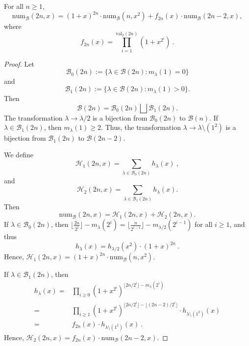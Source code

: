 \documentclass[10pt,a4paper]{amsart}
\def\B{\mathcal{B}}
\def\num{\mathrm{num}}
\def\val{\mathrm{val}}
\begin{document}
\begin{theorem}
For all $n\geq 1$, 
\begin{equation*}
\num_\mathcal B(2n,x)=(1+x)^{2n}\cdot\num_\B(n,x^2)+ f_{2n}(x)\cdot\num_{\B}(2n-2,x),
\end{equation*}
where 
\begin{equation*}
    f_{2n}(x)=\prod_{i=1}^{\val_2(2n)}(1+x^{2^i})\:.
\end{equation*}
\end{theorem}

\begin{proof}
Let 
$$\mathcal B_0(2n):=\{ \lambda\in \mathcal B(2n): m_\lambda(1)=0\} 
$$
and 
$$\mathcal B_1(2n):=\{ \lambda\in \mathcal B(2n): m_\lambda(1)>0\}.$$
 Then  $$\mathcal B(2n)=\mathcal B_0(2n)\bigsqcup \mathcal B_1(2n).$$ 
The transformation $\lambda\to\lambda/2$ is a bijection from $\mathcal B_0(2n)$ to $\mathcal B(n)$.  If $\lambda \in \mathcal B_1(2n)$, then  $m_\lambda(1)\geq 2$. Thus, the transformation $\lambda\to \lambda\setminus(1^2)$ is a bijection from $\mathcal B_1(2n)$ to $\mathcal B(2n-2)$.


We define
 \begin{equation*}\label{eq:recursion_for_numast}
     \mathcal H_1(2n,x)=\sum_{\lambda\in  \B_0(2n)}h_\lambda(x)\:,
 \end{equation*}
and
\begin{equation*}
     \mathcal H_2(2n,x)=\sum_{\lambda\in  \B_1(2n)}h_\lambda(x).
 \end{equation*}
Then 
\begin{equation*}
\num_\mathcal B(2n,x)=\mathcal H_1(2n,x)+ \mathcal H_2(2n,x).
\end{equation*}
If  $\lambda\in \mathcal B_0(2n)$, then $\lfloor \frac{2n}{2^i}\rfloor-m_\lambda(2^i)=\lfloor \frac{n}{2^{i-1}}\rfloor-m_{\lambda/2}(2^{i-1})$ for all $i\geq 1$, and thus
    \[h_\lambda(x)=h_{\lambda/2}(x^2)\cdot(1+x)^{2n}\:.\]
Hence, $\mathcal H_1(2n,x)=(1+x)^{2n}\cdot\num_\B(n,x^2)$.

If $\lambda\in\B_1(2n)$,  then
    \begin{align*}
        h_\lambda(x)=&\prod_{i\geq 0}(1+x^{2^i})^{\lfloor 2n/2^i\rfloor-m_\lambda(2^i)}\\
        =& \prod_{i\geq 1}(1+x^{2^i})^{\lfloor 2n/2^i\rfloor-\lfloor(2n-2)/2^i\rfloor}\cdot h_{\lambda\setminus (1^2)}(x)\\
        =& f_{2n}(x)\cdot h_{\lambda\setminus (1^2)}(x)\:.
    \end{align*}
Hence, $\mathcal H_2(2n,x)=f_{2n}(x)\cdot\num_{\B}(2n-2,x)$.
\end{proof}
\end{document}
